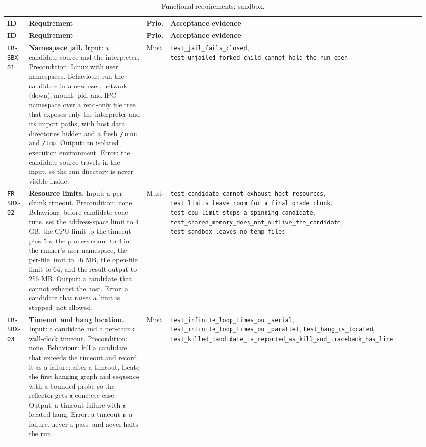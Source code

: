 \begin{longtable}{@{}>{\raggedright\arraybackslash}p{}>{\raggedright\arraybackslash}p{}p{}>{\raggedright\arraybackslash}p{}@{}}
\caption{Functional requirements: sandbox.}\label{tab:fr-sbx}\\
\toprule
\textbf{ID} & \textbf{Requirement} & \textbf{Prio.} & \textbf{Acceptance evidence} \\
\midrule
\endfirsthead
\toprule
\textbf{ID} & \textbf{Requirement} & \textbf{Prio.} & \textbf{Acceptance evidence} \\
\midrule
\endhead
\bottomrule
\endfoot

\texttt{FR-SBX-01} & \textbf{Namespace jail.} Input: a candidate source and the
interpreter. Precondition: Linux with user namespaces. Behaviour: run the
candidate in a new user, network (down), mount, pid, and IPC namespace over a
read-only file tree that exposes only the interpreter and its import paths, with
host data directories hidden and a fresh \texttt{/proc} and \texttt{/tmp}.
Output: an isolated execution environment. Error: the candidate source travels in
the input, so the run directory is never visible inside. & Must &
\texttt{test\_jail\_fails\_closed},
\texttt{test\_unjailed\_forked\_child\_cannot\_hold\_the\_run\_open} \\
\addlinespace[2pt]

\texttt{FR-SBX-02} & \textbf{Resource limits.} Input: a per-chunk timeout.
Precondition: none. Behaviour: before candidate code runs, set the address-space
limit to 4 GB, the CPU limit to the timeout plus 5 s, the process count to 4 in
the runner's user namespace, the per-file limit to 16 MB, the open-file limit to
64, and the result output to 256 MB. Output: a candidate that cannot exhaust the
host. Error: a candidate that raises a limit is stopped, not allowed. & Must &
\texttt{test\_candidate\_cannot\_exhaust\_host\_resources},
\texttt{test\_limits\_leave\_room\_for\_a\_final\_grade\_chunk},
\texttt{test\_cpu\_limit\_stops\_a\_spinning\_candidate},
\texttt{test\_shared\_memory\_does\_not\_outlive\_the\_candidate},
\texttt{test\_sandbox\_leaves\_no\_temp\_files} \\
\addlinespace[2pt]

\texttt{FR-SBX-03} & \textbf{Timeout and hang location.} Input: a candidate and a
per-chunk wall-clock timeout. Precondition: none. Behaviour: kill a candidate that
exceeds the timeout and record it as a failure; after a timeout, locate the first
hanging graph and sequence with a bounded probe so the reflector gets a concrete
case. Output: a timeout failure with a located hang. Error: a timeout is a
failure, never a pass, and never halts the run. & Must &
\texttt{test\_infinite\_loop\_times\_out\_serial},
\texttt{test\_infinite\_loop\_times\_out\_parallel}, \texttt{test\_hang\_is\_located},
\texttt{test\_killed\_candidate\_is\_reported\_as\_kill\_and\_traceback\_has\_line} \\
\addlinespace[2pt]


\end{longtable}
